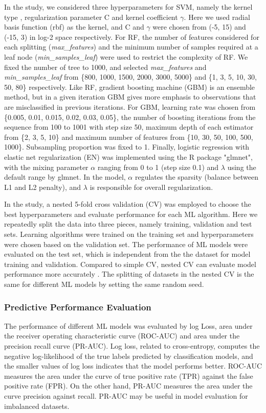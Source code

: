       In the study, we considered three hyperparameters for SVM, namely the kernel type , regularization parameter C and kernel coefficient $\gamma$. Here we used radial basis function (rbf) as the kernel, and C and $\gamma$ were chosen from (-5, 15) and (-15, 3) in log-2 space respectively. For RF, the number of features considered for each splitting (\textit{max\_features}) and the minimum number of samples required at a leaf node (\textit{min\_samples\_leaf}) were used to restrict the complexity of RF. We fixed the number of tree to 1000, and selected \textit{max\_features} and \textit{min\_samples\_leaf} from \{800, 1000, 1500, 2000, 3000, 5000\} and \{1, 3, 5, 10, 30, 50, 80\} respectively. Like RF, gradient boosting machine (GBM) is an ensemble method, but in a given iteration GBM gives more emphasis to observations that are misclassified in previous iterations.  For GBM, learning rate was chosen from \{0.005, 0.01, 0.015, 0.02, 0.03, 0.05\}, the number of boosting iterations from the sequence from 100 to 1001 with step size 50, maximum depth of each estimator from \{2, 3, 5, 10\} and maximum number of features from \{10, 30, 50, 100, 500, 1000\}. Subsampling proportion was fixed to 1. Finally, logistic regression with elastic net regularization (EN) was implemented using the R package "glmnet", with the mixing parameter $\alpha$ ranging from 0 to 1 (step size 0.1) and $\lambda$ using the default range by glmnet. In the model, $\alpha$ regulates the sparsity (balance between L1 and L2 penalty), and $\lambda$ is responsible for overall regularization. 

      In the study, a nested 5-fold cross validation (CV) was employed to choose the best hyperparameters and evaluate performance for each ML algorithm. Here we repeatedly split the data into three pieces, namely training, validation and test sets. Learning algorithms were trained on the training set and hyperparameters were chosen based on the validation set. The performance of ML models were evaluated on the test set, which is independent from the the dataset for model training and validation. Compared to simple CV, nested CV can evaluate model performance more accurately \cite{varma2006bias}. The splitting of datasets in the nested CV is the same for different ML models by setting the same random seed. 
  
    \subsubsection{Predictive Performance Evaluation}
      The performance of different ML models was evaluated by log Loss, area under the receiver operating characteristic curve (ROC-AUC) and area under the precision recall curve (PR-AUC). Log loss, related to cross-entropy, computes the negative log-likelihood of the true labels predicted by classification models, and the smaller values of log loss indicates that the model performs better. ROC-AUC measures the area under the curve of true positive rate (TPR) against the false positive rate (FPR). On the other hand, PR-AUC measures the area under the curve  precision against recall. PR-AUC may be useful in model evaluation for  imbalanced datasets\cite{davis2006relationship}. 
  
